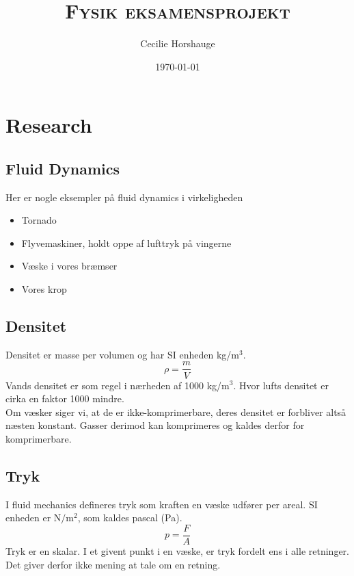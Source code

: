 \documentclass[a4paper, 11pt]{article}
\title{{\large \textsc{Fysik eksamensprojekt}}}
\author{Cecilie Horshauge}
\date{\today}
\begin{document}
\maketitle
\section{Research}
\subsection{Fluid Dynamics}
Her er nogle eksempler på fluid dynamics i virkeligheden
\begin{itemize}
    \item Tornado
    \item Flyvemaskiner, holdt oppe af lufttryk på vingerne
    \item Væske i vores bræmser
    \item Vores krop
\end{itemize}
\subsection*{Densitet}
Densitet er masse per volumen og har SI enheden kg/\(\text{m}^3\).
\begin{equation}
    \label{densitet}
    \rho = \frac{m}{V}
\end{equation}
Vands densitet er som regel i nærheden af 1000 kg/\(\text{m}^3\). Hvor lufts densitet er cirka en faktor 1000 mindre.\\
Om væsker siger vi, at de er ikke-komprimerbare, deres densitet er forbliver altså næsten konstant. Gasser derimod kan komprimeres og kaldes derfor for komprimerbare.
\subsection*{Tryk}
I fluid mechanics defineres tryk som kraften en væske udfører per areal. SI enheden er \(\text{N}/\text{m}^2\), som kaldes pascal (Pa).
\begin{equation}
    \label{tryk}
    p=\frac{F}{A}
\end{equation}
Tryk er en skalar. I et givent punkt i en væske, er tryk fordelt ens i alle retninger. Det giver derfor ikke mening at tale om en retning. 
\end{document}
